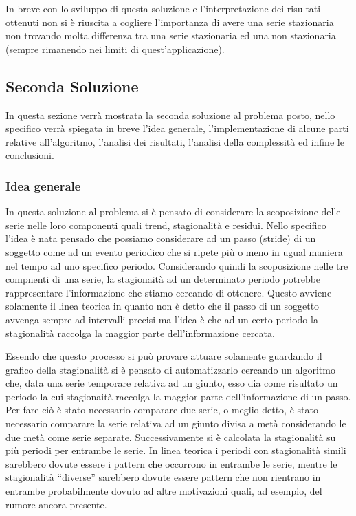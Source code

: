 In breve con lo sviluppo di questa soluzione e l'interpretazione dei risultati ottenuti
non si è riuscita a cogliere l'importanza di avere una serie stazionaria non trovando
molta differenza tra una serie stazionaria ed una non stazionaria (sempre rimanendo nei
limiti di quest'applicazione).

\subsection{Seconda Soluzione}
In questa sezione verrà mostrata la seconda soluzione al problema posto, nello
specifico verrà spiegata in breve l’idea generale, l’implementazione di alcune parti relative all'algoritmo, 
l’analisi dei risultati, l’analisi della complessità ed infine
le conclusioni.

\subsubsection{Idea generale}
In questa soluzione al problema si è pensato di considerare la scoposizione delle serie nelle 
loro componenti quali trend, stagionalità e residui. Nello specifico l'idea è nata
pensado che possiamo considerare ad un passo (stride) di un soggetto come ad un evento periodico
che si ripete più o meno in ugual maniera nel tempo ad uno specifico periodo. Considerando quindi
la scoposizione nelle tre compnenti di una serie, la stagionaità ad un determinato periodo potrebbe
rappresentare l'informazione che stiamo cercando di ottenere. Questo avviene solamente il linea teorica
in quanto non è detto che il passo di un soggetto avvenga sempre ad intervalli precisi ma l'idea è che
ad un certo periodo la stagionalità raccolga la maggior parte dell'informazione cercata.

Essendo che questo processo si può provare attuare solamente guardando il grafico della stagionalità
si è pensato di automatizzarlo cercando un algoritmo che, data una serie temporare relativa ad un giunto,
esso dia come risultato un periodo
la cui stagionaità raccolga la maggior parte dell'informazione di un passo. Per fare ciò è stato 
necessario comparare due serie, o meglio detto, è stato necessario comparare la serie relativa 
ad un giunto divisa a metà considerando le due metà come serie separate. Successivamente
si è calcolata la stagionalità su più periodi per entrambe le serie. In linea teorica i periodi con
stagionalità simili sarebbero dovute essere i pattern che occorrono in entrambe le serie,
mentre le stagionalità ``diverse'' sarebbero dovute essere pattern che non rientrano 
in entrambe probabilmente dovuto ad altre motivazioni quali, ad esempio, del rumore ancora presente.





